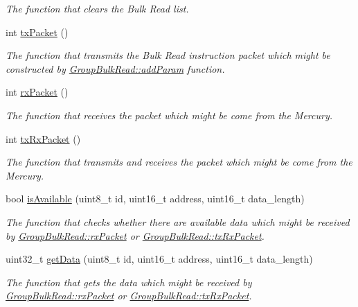 \begin{DoxyCompactItemize}
\begin{DoxyCompactList}\small\item\em The function that clears the Bulk Read list. \end{DoxyCompactList}\item 
int \hyperlink{classmercury_1_1_group_bulk_read_acc37aa26808f73af17c8ccd418256008}{tx\+Packet} ()
\begin{DoxyCompactList}\small\item\em The function that transmits the Bulk Read instruction packet which might be constructed by \hyperlink{classmercury_1_1_group_bulk_read_a1fdaca39d85fe45525d0da304bb8fa0b}{Group\+Bulk\+Read\+::add\+Param} function. \end{DoxyCompactList}\item 
int \hyperlink{classmercury_1_1_group_bulk_read_a3bc43ddf2eceb8c4e3866fe13465d889}{rx\+Packet} ()
\begin{DoxyCompactList}\small\item\em The function that receives the packet which might be come from the Mercury. \end{DoxyCompactList}\item 
int \hyperlink{classmercury_1_1_group_bulk_read_aaef8e0ee13233d46e19bd2c433defcc5}{tx\+Rx\+Packet} ()
\begin{DoxyCompactList}\small\item\em The function that transmits and receives the packet which might be come from the Mercury. \end{DoxyCompactList}\item 
bool \hyperlink{classmercury_1_1_group_bulk_read_aebbee267376666fe5694a1cc0f1d7ab1}{is\+Available} (uint8\+\_\+t id, uint16\+\_\+t address, uint16\+\_\+t data\+\_\+length)
\begin{DoxyCompactList}\small\item\em The function that checks whether there are available data which might be received by \hyperlink{classmercury_1_1_group_bulk_read_a3bc43ddf2eceb8c4e3866fe13465d889}{Group\+Bulk\+Read\+::rx\+Packet} or \hyperlink{classmercury_1_1_group_bulk_read_aaef8e0ee13233d46e19bd2c433defcc5}{Group\+Bulk\+Read\+::tx\+Rx\+Packet}. \end{DoxyCompactList}\item 
uint32\+\_\+t \hyperlink{classmercury_1_1_group_bulk_read_a20fa38efc58e214731285b28a25e43f7}{get\+Data} (uint8\+\_\+t id, uint16\+\_\+t address, uint16\+\_\+t data\+\_\+length)
\begin{DoxyCompactList}\small\item\em The function that gets the data which might be received by \hyperlink{classmercury_1_1_group_bulk_read_a3bc43ddf2eceb8c4e3866fe13465d889}{Group\+Bulk\+Read\+::rx\+Packet} or \hyperlink{classmercury_1_1_group_bulk_read_aaef8e0ee13233d46e19bd2c433defcc5}{Group\+Bulk\+Read\+::tx\+Rx\+Packet}. \end{DoxyCompactList}\end{DoxyCompactItemize}


